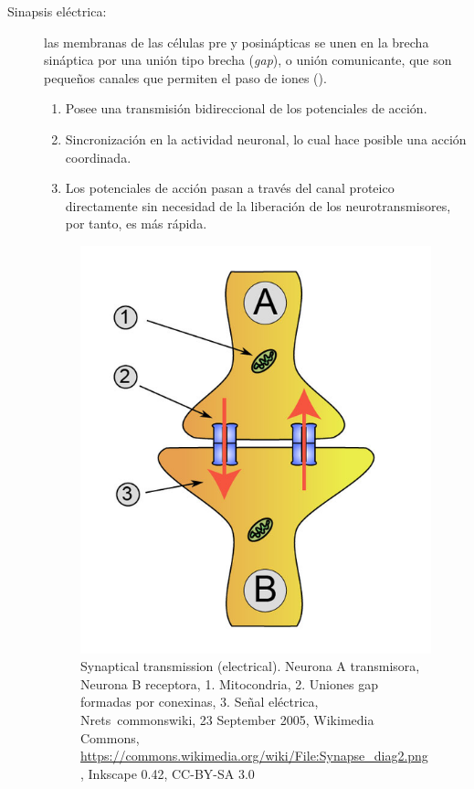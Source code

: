 \begin{description}
 \item [Sinapsis eléctrica:] las membranas de las células pre y posinápticas se unen en la brecha sináptica por una unión tipo brecha (\textit{gap}), o unión comunicante, que son pequeños canales que permiten el paso de iones ().


	\begin{enumerate}
  	 \item Posee una transmisión bidireccional de los potenciales de acción.
  	 \item Sincronización en la actividad neuronal, lo cual hace posible una acción coordinada.
 	 \item Los potenciales de acción pasan a través del canal proteico directamente sin necesidad de la liberación de los neurotransmisores, por tanto, es más rápida.
	\end{enumerate}


\begin{figure}[h]
 \centering
 \includegraphics[scale=0.4]{../Figuras/sinapsisElectrica.png}
 \caption{Synaptical transmission (electrical). Neurona A transmisora, Neurona B receptora, 1. Mitocondria, 2. Uniones gap formadas por conexinas, 3. Señal eléctrica, Nrets~commonswiki, 23 September 2005, Wikimedia Commons, \url{https://commons.wikimedia.org/wiki/File:Synapse_diag2.png}, Inkscape 0.42, CC-BY-SA 3.0}
 \label{fig:sinapsisN}
\end{figure}
 

\end{description}
